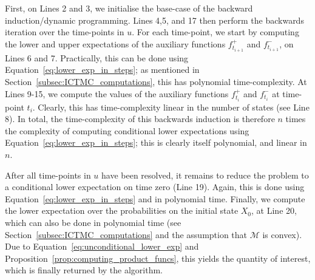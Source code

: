 \documentclass[3p]{elsarticle}
\begin{document}
First, on Lines 2 and 3, we initialise the base-case of the backward induction/dynamic programming. Lines 4,5, and 17 then perform the backwards iteration over the time-points in $u$. For each time-point, we start by computing the lower and upper expectations of the auxiliary functions $f^+_{t_{i+1}}$ and $f^-_{t_{i+1}}$, on Lines 6 and 7. Practically, this can be done using Equation~\eqref{eq:lower_exp_in_steps}; as mentioned in Section~\ref{subsec:ICTMC_computations}, this has polynomial time-complexity. At Lines 9-15, we compute the values of the auxiliary functions $f^+_{t_i}$ and $f^-_{t_i}$ at time-point $t_i$. Clearly, this has time-complexity linear in the number of states (see Line 8). In total, the time-complexity of this backwards induction is therefore $n$ times the complexity of computing conditional lower expectations using Equation~\eqref{eq:lower_exp_in_steps}; this is clearly itself polynomial, and linear in $n$.

After all time-points in $u$ have been resolved, it remains to reduce the problem to a conditional lower expectation on time zero (Line 19). Again, this is done using Equation~\eqref{eq:lower_exp_in_steps} and in polynomial time. Finally, we compute the lower expectation over the probabilities on the initial state $X_0$, at Line 20, which can also be done in polynomial time (see Section~\ref{subsec:ICTMC_computations} and the assumption that $\mathcal{M}$ is convex). Due to Equation~\eqref{eq:unconditional_lower_exp} and Proposition~\ref{prop:computing_product_funcs}, this yields the quantity of interest, which is finally returned by the algorithm.
\end{document}
